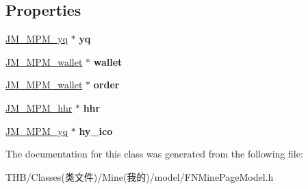 \subsection*{Properties}
\begin{DoxyCompactItemize}
\item 
\mbox{\label{interface_f_n_mine_page_model_a5616387bf659a45ec33238f4ec420408}} 
\mbox{\hyperlink{interface_j_m___m_p_m__yq}{J\+M\+\_\+\+M\+P\+M\+\_\+yq}} $\ast$ {\bfseries yq}
\item 
\mbox{\label{interface_f_n_mine_page_model_ad5f7016f98507cb7c236a6e5cac838b0}} 
\mbox{\hyperlink{interface_j_m___m_p_m__wallet}{J\+M\+\_\+\+M\+P\+M\+\_\+wallet}} $\ast$ {\bfseries wallet}
\item 
\mbox{\label{interface_f_n_mine_page_model_a5a93467cb50ff4e1cb6ccfe11ebf244f}} 
\mbox{\hyperlink{interface_j_m___m_p_m__wallet}{J\+M\+\_\+\+M\+P\+M\+\_\+wallet}} $\ast$ {\bfseries order}
\item 
\mbox{\label{interface_f_n_mine_page_model_a5f98ca3277d811263cc0388c39ecaaeb}} 
\mbox{\hyperlink{interface_j_m___m_p_m__hhr}{J\+M\+\_\+\+M\+P\+M\+\_\+hhr}} $\ast$ {\bfseries hhr}
\item 
\mbox{\label{interface_f_n_mine_page_model_afa118d2858c43d835f3ce900d8fc584d}} 
\mbox{\hyperlink{interface_j_m___m_p_m__yq}{J\+M\+\_\+\+M\+P\+M\+\_\+yq}} $\ast$ {\bfseries hy\+\_\+ico}
\end{DoxyCompactItemize}


The documentation for this class was generated from the following file\+:\begin{DoxyCompactItemize}
\item 
T\+H\+B/\+Classes(类文件)/\+Mine(我的)/model/F\+N\+Mine\+Page\+Model.\+h\end{DoxyCompactItemize}
